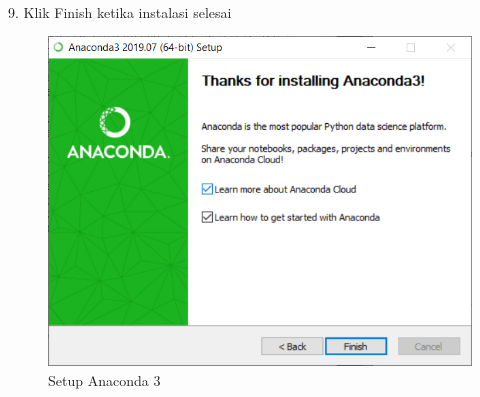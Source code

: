 \documentclass{article}
\begin{document}
\\
\\
\\
\\
\\
\\
\\
\\
\\
\\
\\
\\
\\
9. Klik Finish ketika instalasi selesai\\
\begin{figure}[h]
	\centering
		\includegraphics[scale=0.5]{Gambar/A9.PNG}
		\caption{Setup Anaconda 3}
\end{figure}
\end{document}
